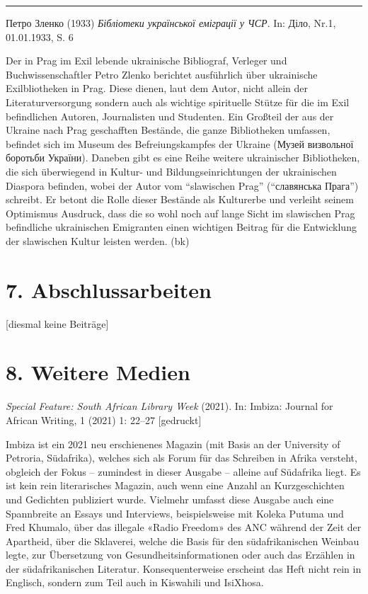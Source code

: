 \documentclass[a4paper,
fontsize=11pt,
oneside,
numbers=noperiodatend,
parskip=half-,
bibliography=totoc,
final
]{scrartcl}
\begin{document}
\begin{center}\rule{0.5\linewidth}{0.5pt}\end{center}

Петро Зленко 
(1933) 
\emph{Бібліотеки української еміграції у ЧСР}. 
In:
Діло, 
Nr.1, 01.01.1933, S. 6

Der in Prag im Exil lebende ukrainische Bibliograf, Verleger und
Buchwissenschaftler Petro Zlenko berichtet ausführlich über ukrainische
Exilbliotheken in Prag. Diese dienen, laut dem Autor, nicht allein der
Literaturversorgung sondern auch als wichtige spirituelle Stütze für die
im Exil befindlichen Autoren, Journalisten und Studenten. Ein Großteil
der aus der Ukraine nach Prag geschafften Bestände, die ganze
Bibliotheken umfassen, befindet sich im Museum des Befreiungskampfes der
Ukraine (Музей визвольної боротьби України). Daneben gibt es eine Reihe
weitere ukrainischer Bibliotheken, die sich überwiegend in Kultur- und
Bildungseinrichtungen der ukrainischen Diaspora befinden, wobei der
Autor vom \enquote{slawischen Prag} (\enquote{славянська Прага}) schreibt. Er betont die Rolle dieser Bestände als Kulturerbe und
verleiht seinem Optimismus Ausdruck, dass die so wohl noch auf lange
Sicht im slawischen Prag befindliche ukrainischen Emigranten einen
wichtigen Beitrag für die Entwicklung der slawischen Kultur leisten
werden. (bk)

\hypertarget{abschlussarbeiten}{%
\section{7. Abschlussarbeiten}\label{abschlussarbeiten}}

{[}diesmal keine Beiträge{]}

\hypertarget{weitere-medien}{%
\section{8. Weitere Medien}\label{weitere-medien}}

\emph{Special Feature: South African Library Week} (2021). In: Imbiza:
Journal for African Writing, 1 (2021) 1: 22--27 {[}gedruckt{]}

Imbiza ist ein 2021 neu erschienenes Magazin (mit Basis an der
University of Petroria, Südafrika), welches sich als Forum für das
Schreiben in Afrika versteht, obgleich der Fokus -- zumindest in dieser
Ausgabe -- alleine auf Südafrika liegt. Es ist kein rein literarisches
Magazin, auch wenn eine Anzahl an Kurzgeschichten und Gedichten
publiziert wurde. Vielmehr umfasst diese Ausgabe auch eine Spannbreite
an Essays und Interviews, beispielsweise mit Koleka Putuma und Fred
Khumalo, über das illegale «Radio Freedom» des ANC während der Zeit der
Apartheid, über die Sklaverei, welche die Basis für den südafrikanischen
Weinbau legte, zur Übersetzung von Gesundheitsinformationen oder auch
das Erzählen in der südafrikanischen Literatur. Konsequenterweise
erscheint das Heft nicht rein in Englisch, sondern zum Teil auch in
Kiswahili und IsiXhosa.
\end{document}
